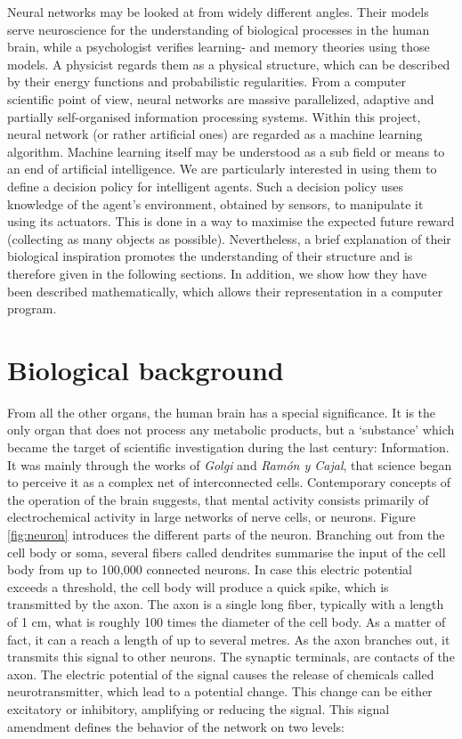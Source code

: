 \documentclass[10pt,a4paper,DIV=11]{scrreprt}
\begin{document}
Neural networks may be looked at from widely different angles. Their models serve neuroscience for the understanding of biological processes 
in the human brain, while a psychologist verifies learning- and memory theories using those models. A physicist regards them as a physical structure,
which can be described by their energy functions and probabilistic regularities. From a computer scientific point of view, neural networks
are massive parallelized, adaptive and partially self-organised information processing systems. \cite{NNGER}
Within this project, neural network (or rather artificial ones) are regarded as a machine learning algorithm. 
Machine learning itself may be understood as a sub field or means to an end of artificial intelligence.
We are particularly interested in using them to define a decision policy for intelligent agents. Such a decision policy uses knowledge of the agent's
environment, obtained by sensors, to manipulate it using its actuators. This is done in a way to maximise the expected future reward (collecting as
many objects as possible). Nevertheless, a brief explanation of their biological inspiration promotes the understanding of their structure and is 
therefore given in the following sections. In addition, we show how they have been described mathematically, which allows their representation 
in a computer program.

\section{Biological background}
From all the other organs, the human brain has a special significance. It is the only organ that does not process any metabolic products, but a 
‘substance’ which became the target of scientific investigation during the last century: Information. It was mainly through the works of 
\textit{Golgi} and \textit{Ramón y Cajal}, that science began to perceive it as a complex net of interconnected cells.  Contemporary 
concepts of the operation of the brain suggests, that mental activity consists primarily of electrochemical activity in large networks of nerve 
cells, or neurons.  Figure \ref{fig:neuron} introduces the different parts of the neuron. Branching out from the cell body or soma, several fibers 
called dendrites summarise the input of the cell body from up to 100,000 connected neurons. In case this electric potential exceeds a threshold, 
the cell body will produce a quick spike, which is transmitted by the axon. The axon is a single long fiber, typically with a length of 1 cm, 
what is roughly 100 times the diameter of the cell body. As a matter of fact, it can a reach a length of up to several metres. As the axon branches 
out, it transmits this signal to other neurons. The synaptic terminals, are contacts of the axon. The electric potential of the signal causes the 
release of chemicals called neurotransmitter, which lead to a potential change. This change can be either excitatory or inhibitory, amplifying or 
reducing the signal. This signal amendment defines the behavior of the network on two levels: 
\end{document}
